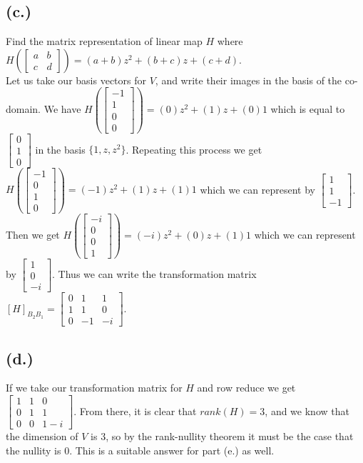 \documentclass{article}
\begin{document}
	\subsection*{(c.)}
		Find the matrix representation of linear map $H$ where $H\left(\begin{bmatrix}a&b\\c&d\end{bmatrix}\right)=(a+b)z^2+(b+c)z+(c+d)$.\\

		Let us take our basis vectors for $V$, and write their images in the basis of the co-domain.
		We have $H\left(\begin{bmatrix}-1\\1\\0\\0\end{bmatrix}\right) = (0)z^2+(1)z+(0)1$ which is equal to $\begin{bmatrix}0\\1\\0\end{bmatrix}$ in the basis $\{1,z,z^2\}$.
		Repeating this process we get $H\left(\begin{bmatrix}-1\\0\\1\\0\end{bmatrix}\right) = (-1)z^2+(1)z+(1)1$ which we can represent by $\begin{bmatrix}1\\1\\-1\end{bmatrix}$.
		Then we get $H\left(\begin{bmatrix}-i\\0\\0\\1\end{bmatrix}\right) = (-i)z^2+(0)z+(1)1$ which we can represent by $\begin{bmatrix}1\\0\\-i\end{bmatrix}$.
		Thus we can write the transformation matrix $[H]_{B_2B_1}= \begin{bmatrix}0&1&1\\1&1&0\\0&-1&-i\end{bmatrix}$.
	\subsection*{(d.)}
		If we take our transformation matrix for $H$ and row reduce we get $\begin{bmatrix}1&1&0\\0&1&1\\0&0&1-i\end{bmatrix}$. 
		From there, it is clear that $rank(H) = 3$, and we know that the dimension of $V$ is 3, so by the rank-nullity theorem it must be the case that the nullity is 0.
		This is a suitable answer for part (e.) as well.
\end{document}
